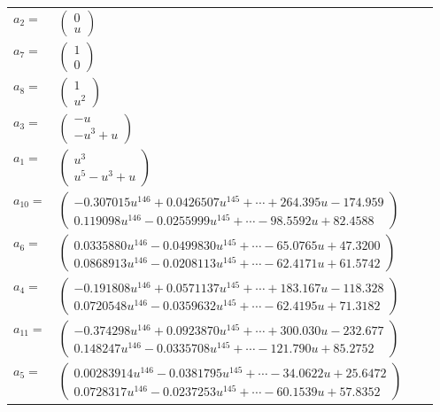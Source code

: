 \documentclass[1p]{elsarticle_modified}
\theoremstyle{definition}
\begin{document}
\begin{tabular}{m{7pt} m{180pt} m{7pt} m{180pt} }
\flushright $a_{2}=$&$\begin{pmatrix}0\\u\end{pmatrix}$ \\
\flushright $a_{7}=$&$\begin{pmatrix}1\\0\end{pmatrix}$ \\
\flushright $a_{8}=$&$\begin{pmatrix}1\\u^2\end{pmatrix}$ \\
\flushright $a_{3}=$&$\begin{pmatrix}- u\\- u^3+u\end{pmatrix}$ \\
\flushright $a_{1}=$&$\begin{pmatrix}u^3\\u^5- u^3+u\end{pmatrix}$ \\
\flushright $a_{10}=$&$\begin{pmatrix}-0.307015 u^{146}+0.0426507 u^{145}+\cdots+264.395 u-174.959\\0.119098 u^{146}-0.0255999 u^{145}+\cdots-98.5592 u+82.4588\end{pmatrix}$ \\
\flushright $a_{6}=$&$\begin{pmatrix}0.0335880 u^{146}-0.0499830 u^{145}+\cdots-65.0765 u+47.3200\\0.0868913 u^{146}-0.0208113 u^{145}+\cdots-62.4171 u+61.5742\end{pmatrix}$ \\
\flushright $a_{4}=$&$\begin{pmatrix}-0.191808 u^{146}+0.0571137 u^{145}+\cdots+183.167 u-118.328\\0.0720548 u^{146}-0.0359632 u^{145}+\cdots-62.4195 u+71.3182\end{pmatrix}$ \\
\flushright $a_{11}=$&$\begin{pmatrix}-0.374298 u^{146}+0.0923870 u^{145}+\cdots+300.030 u-232.677\\0.148247 u^{146}-0.0335708 u^{145}+\cdots-121.790 u+85.2752\end{pmatrix}$ \\
\flushright $a_{5}=$&$\begin{pmatrix}0.00283914 u^{146}-0.0381795 u^{145}+\cdots-34.0622 u+25.6472\\0.0728317 u^{146}-0.0237253 u^{145}+\cdots-60.1539 u+57.8352\end{pmatrix}$ \\

\end{tabular}
\end{document}
